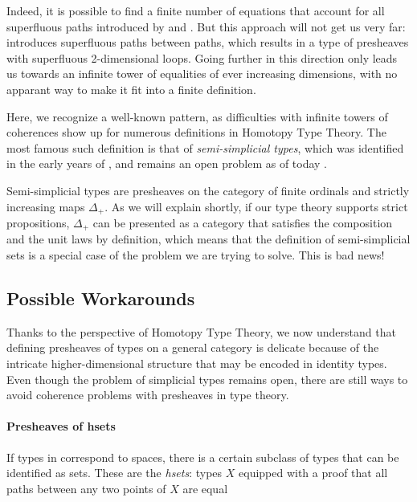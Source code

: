 Indeed, it is possible to find a finite number of equations that account for 
all superfluous paths introduced by  and .  
But this approach will not get us very far: 
% 
 introduces superfluous paths between paths, which results in
a type of presheaves with superfluous 2-dimensional loops.
% 
Going further in this direction only leads us towards an infinite tower 
of equalities of ever increasing dimensions, with no apparant way to make it 
fit into a finite definition.

Here, we recognize a well-known pattern, as difficulties with infinite 
towers of coherences show up for numerous definitions in Homotopy Type Theory.
% 
The most famous such definition is that of \emph{semi-simplicial types}, 
which was identified in the early years of \HoTT \cite{IAS2012semisimplicial}, 
and remains an open problem as of today .

Semi-simplicial types are presheaves on the category of finite ordinals and 
strictly increasing maps \( \Delta_+ \).
% 
As we will explain shortly, if our type theory supports strict propositions,
\( \Delta_+ \) can be presented as a category that satisfies the composition
and the unit laws by definition, which means that the definition of 
semi-simplicial sets is a special case of the problem we are trying to solve.
% 
This is bad news!

\subsection{Possible Workarounds}

Thanks to the perspective of Homotopy Type Theory, we now understand that
defining presheaves of types on a general category is delicate because of the 
intricate higher-dimensional structure that may be encoded in identity types.
% 
Even though the problem of simplicial types remains open, there are still 
ways to avoid coherence problems with presheaves in type theory.

\paragraph{Presheaves of hsets} If types in \HoTT correspond to spaces, there 
is a certain subclass of types that can be identified as sets.
% 
These are the \emph{hsets}: types \( X \) equipped with a proof that all 
paths between any two points of \( X \) are equal



